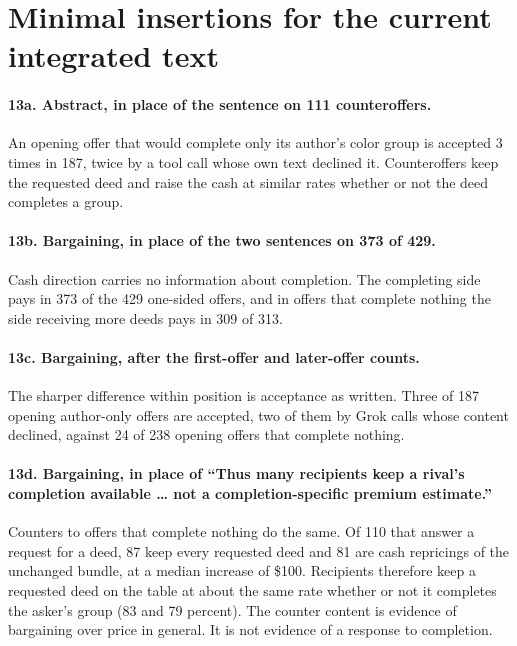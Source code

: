 \section{Minimal insertions for the current integrated text}

\paragraph{13a. Abstract, in place of the sentence on 111 counteroffers.} An opening offer that would complete only its author's color group is accepted 3 times in 187, twice by a tool call whose own text declined it. Counteroffers keep the requested deed and raise the cash at similar rates whether or not the deed completes a group.

\paragraph{13b. Bargaining, in place of the two sentences on 373 of 429.} Cash direction carries no information about completion. The completing side pays in 373 of the 429 one-sided offers, and in offers that complete nothing the side receiving more deeds pays in 309 of 313.

\paragraph{13c. Bargaining, after the first-offer and later-offer counts.} The sharper difference within position is acceptance as written. Three of 187 opening author-only offers are accepted, two of them by Grok calls whose content declined, against 24 of 238 opening offers that complete nothing.

\paragraph{13d. Bargaining, in place of ``Thus many recipients keep a rival's completion available \ldots{} not a completion-specific premium estimate.''} Counters to offers that complete nothing do the same. Of 110 that answer a request for a deed, 87 keep every requested deed and 81 are cash repricings of the unchanged bundle, at a median increase of \$100. Recipients therefore keep a requested deed on the table at about the same rate whether or not it completes the asker's group (83 and 79 percent). The counter content is evidence of bargaining over price in general. It is not evidence of a response to completion.

